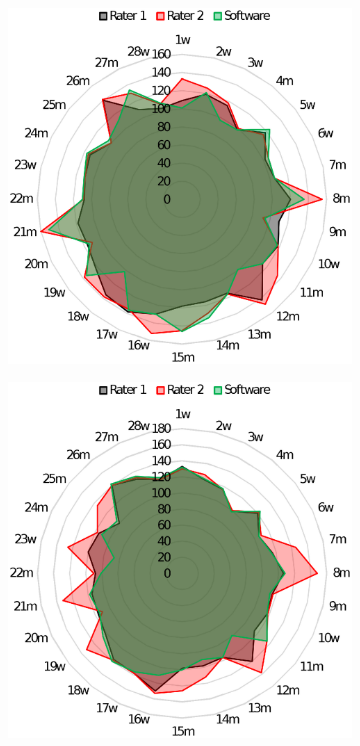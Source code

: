 %
\begin{figure}[H]
	\centering
	\begin{subfigure}[c]{0.45\textwidth}
		\centering
		\includegraphics[scale=0.4]{Bilder/v-slope_net.eps}
			\label{subpic:pic1}
	\end{subfigure}%
	\hfil
	\begin{subfigure}[c]{0.45\textwidth}
		\centering
		\includegraphics[scale=0.4]{Bilder/eqo2_net.eps}

\end{subfigure}
\end{figure}
